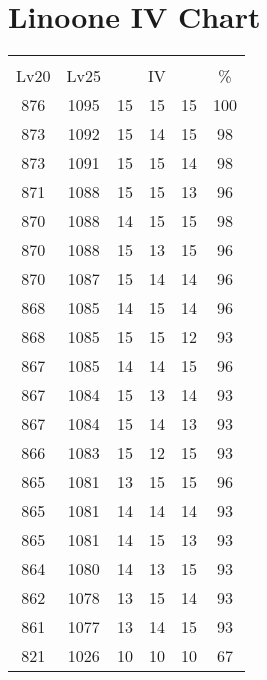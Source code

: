 \documentclass{article}%
\begin{document}
%
\normalsize%
\section{Linoone IV Chart}%
\label{sec:Linoone IV Chart}%
\renewcommand{\arraystretch}{1.5}%
\begin{tabular}{|c|c|c|c|c|c|}%
\hline%
\multicolumn{6}{|c|}{\textcolor{white}{ 
\linebreak{Linoone}
}%
\cellcolor{black}}\\%
\multicolumn{1}{|c}{Lv20}&\multicolumn{1}{c|}{Lv25}&\multicolumn{3}{c|}{IV}&\multicolumn{1}{|c|}{\%}\\%
\hline%
\rowcolor{color100}%
876&1095&15&15&15&100\\%
\hline%
\rowcolor{color98}%
873&1092&15&14&15&98\\%
\hline%
\rowcolor{color98}%
873&1091&15&15&14&98\\%
\hline%
\rowcolor{color96}%
871&1088&15&15&13&96\\%
\hline%
\rowcolor{color98}%
870&1088&14&15&15&98\\%
\hline%
\rowcolor{color96}%
870&1088&15&13&15&96\\%
\hline%
\rowcolor{color96}%
870&1087&15&14&14&96\\%
\hline%
\rowcolor{color96}%
868&1085&14&15&14&96\\%
\hline%
\rowcolor{color93}%
868&1085&15&15&12&93\\%
\hline%
\rowcolor{color96}%
867&1085&14&14&15&96\\%
\hline%
\rowcolor{color93}%
867&1084&15&13&14&93\\%
\hline%
\rowcolor{color93}%
867&1084&15&14&13&93\\%
\hline%
\rowcolor{color93}%
866&1083&15&12&15&93\\%
\hline%
\rowcolor{color96}%
865&1081&13&15&15&96\\%
\hline%
\rowcolor{color93}%
865&1081&14&14&14&93\\%
\hline%
\rowcolor{color93}%
865&1081&14&15&13&93\\%
\hline%
\rowcolor{color93}%
864&1080&14&13&15&93\\%
\hline%
\rowcolor{color93}%
862&1078&13&15&14&93\\%
\hline%
\rowcolor{color93}%
861&1077&13&14&15&93\\%
\hline%
\rowcolor{color91}%
821&1026&10&10&10&67\\%
\end{tabular}

%
\end{document}
